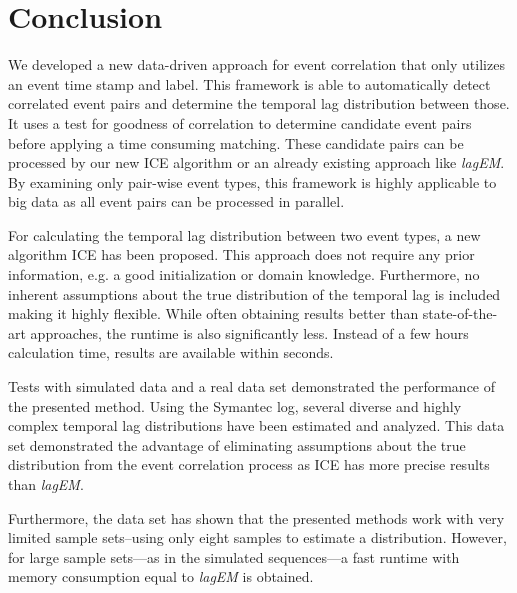 \documentclass[conference]{IEEEtran}
\theoremstyle{examplestyle}
\begin{document}
\section{Conclusion} \label{sec:conc}
We developed a new data-driven approach for event correlation that only utilizes an event time stamp and label. This framework is able to automatically detect correlated event pairs and determine the temporal lag distribution between those. It uses a test for goodness of correlation to determine candidate event pairs before applying a time consuming matching. These candidate pairs can be processed by our new \ac{ICE} algorithm or an already existing approach like \textit{lagEM}. By examining only pair-wise event types, this framework is highly applicable to big data as all event pairs can be processed in parallel.

For calculating the temporal lag distribution between two event types, a new algorithm \ac{ICE} has been proposed. This approach does not require any prior information, e.g. a good initialization or domain knowledge. Furthermore, no inherent assumptions about the true distribution of the temporal lag is included making it highly flexible. While often obtaining results better than state-of-the-art approaches, the runtime is also significantly less. Instead of a few hours calculation time, results are available within seconds.

Tests with simulated data and a real data set demonstrated the performance of the presented method. Using the Symantec log, several diverse and highly complex temporal lag distributions have been estimated and analyzed. This data set demonstrated the advantage of eliminating assumptions about the true distribution from the event correlation process as \ac{ICE} has more precise results than \textit{lagEM}.

Furthermore, the data set has shown that the presented methods work with very limited sample sets--using only eight samples to estimate a distribution. However, for large sample sets---as in the simulated sequences---a fast runtime with memory consumption equal to \textit{lagEM} is obtained.





% 
% 










\end{document}
